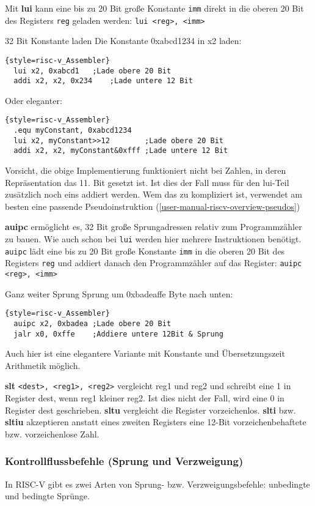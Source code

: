 Mit \textbf{lui} kann eine bis zu 20 Bit große Konstante \texttt{imm} direkt in die oberen 20 Bit des Registers \texttt{reg} geladen werden:
\texttt{lui <reg>, <imm>}
\begin{exampleblock}{32 Bit Konstante laden}
Die Konstante 0xabcd1234 in x2 laden:\\
\begin{lstlisting}{style=risc-v_Assembler}
  lui x2, 0xabcd1 	;Lade obere 20 Bit
  addi x2, x2, 0x234	;Lade untere 12 Bit
\end{lstlisting}
Oder eleganter:
\begin{lstlisting}{style=risc-v_Assembler}	
  .equ myConstant, 0xabcd1234
  lui x2, myConstant>>12        ;Lade obere 20 Bit
  addi x2, x2, myConstant&0xfff ;Lade untere 12 Bit
\end{lstlisting}
Vorsicht, die obige Implementierung funktioniert nicht bei Zahlen, in deren Repräsentation das 11. Bit gesetzt ist. Ist dies der Fall muss für den lui-Teil zusätzlich noch eins addiert werden. Wem das zu kompliziert ist, verwendet am besten eine passende Pseudoinstruktion (\autoref{user-manual-riscv-overview-pseudos})
\end{exampleblock}
\textbf{auipc} ermöglicht es, 32 Bit große Sprungadressen relativ zum Programmzähler zu bauen. Wie auch schon bei \texttt{lui} werden hier mehrere Instruktionen benötigt. \texttt{auipc} lädt eine bis zu 20 Bit große Konstante \texttt{imm} in die oberen 20 Bit des Registers \texttt{reg} und addiert danach den Programmzähler auf das Register:
\texttt{auipc <reg>, <imm>}
\begin{exampleblock}{Ganz weiter Sprung}
Sprung um 0xbadeaffe Byte nach unten:
\begin{lstlisting}{style=risc-v_Assembler}
  auipc x2, 0xbadea	;Lade obere 20 Bit
  jalr x0, 0xffe	;Addiere untere 12Bit & Sprung
\end{lstlisting}
Auch hier ist eine elegantere Variante mit Konstante und Übersetzungszeit Arithmetik möglich.
\end{exampleblock}

\textbf{slt} \texttt{<dest>, <reg1>, <reg2>} vergleicht reg1 und reg2 und schreibt eine 1 in Register dest, wenn reg1 kleiner reg2. Ist dies nicht der Fall, wird eine 0 in Register dest geschrieben. \textbf{sltu} vergleicht die Register vorzeichenlos. \textbf{slti} bzw. \textbf{sltiu} akzeptieren anstatt eines zweiten Registers eine 12-Bit vorzeichenbehaftete bzw. vorzeichenlose Zahl.

\subsubsection{Kontrollflussbefehle (Sprung und Verzweigung)}
\label{manual-riscv-jump-instructions}
In RISC-V gibt es zwei Arten von Sprung- bzw. Verzweigungsbefehle: unbedingte und bedingte Sprünge.

